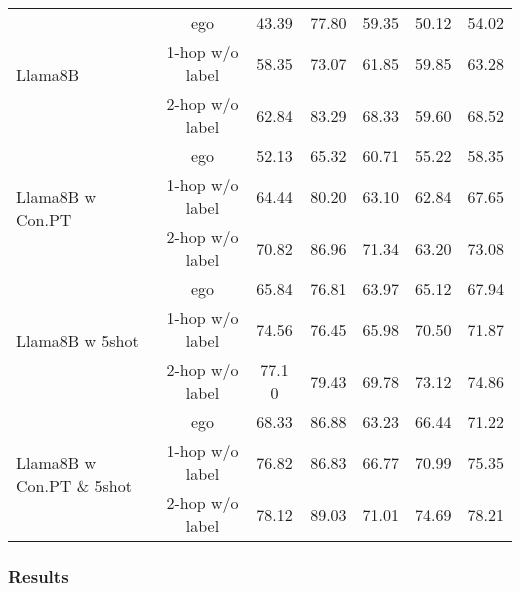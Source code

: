 \begin{table}[htbp]
{\begin{tabular}{l c c c c c c}
\multirow{3}{*}{Llama8B} & ego & 43.39 & 77.80 & 59.35 & 50.12 & 54.02 \\
& 1-hop w/o label & 58.35 & 73.07 & 61.85 & 59.85 & 63.28 \\
& 2-hop w/o label & 62.84 & 83.29 & 68.33 & 59.60 & 68.52 \\
\midrule
\multirow{3}{*}{Llama8B w Con.PT} & ego & 52.13 & 65.32 & 60.71 & 55.22 & 58.35 \\
& 1-hop w/o label & 64.44 & 80.20 & 63.10 & 62.84 & 67.65 \\
& 2-hop w/o label & 70.82  & 86.96 \cellcolor{cyan!20}  & 71.34 \cellcolor{cyan!100}  & 63.20 & 73.08  \\
\midrule
\multirow{3}{*}{Llama8B w 5shot} & ego & 65.84 & 76.81 & 63.97 & 65.12 & 67.94  \\
& 1-hop w/o label & 74.56 & 76.45 & 65.98 & 70.50 & 71.87  \\
& 2-hop w/o label & 77.1 \cellcolor{cyan!20}0  & 79.43 & 69.78  & 73.12 \cellcolor{cyan!50}  & 74.86 \cellcolor{cyan!20}  \\
\midrule
\multirow{3}{*}{Llama8B w Con.PT \& 5shot} & ego & 68.33 & 86.88  & 63.23 & 66.44 & 71.22 \\
& 1-hop w/o label & 76.82 & 86.83 & 66.77  & 70.99 \cellcolor{cyan!20}  & 75.35 \cellcolor{cyan!50}  \\
& 2-hop w/o label & 78.12 \cellcolor{cyan!50}  & 89.03 \cellcolor{cyan!100}  & 71.01 \cellcolor{cyan!50}  & 74.69 \cellcolor{cyan!100}  & 78.21 \cellcolor{cyan!100}  \\
\bottomrule
\end{tabular}
}
\end{table}



\subsubsection{Results}

